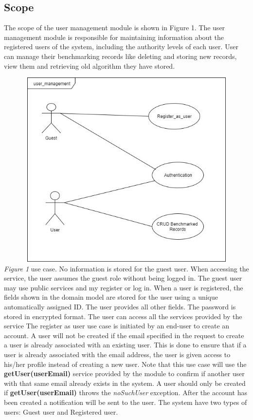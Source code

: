 \documentclass[runningheads,a4paper]{article}
\begin{document}
\subsection{Scope}
The scope of the user management module is shown in Figure 1. The user
management module is responsible for maintaining information about the registered
users of the system, including the authority levels of each user. User can manage their benchmarking records like deleting and storing new records, view them and retrieving old algorithm they have stored.

\includegraphics[width=15cm , height=10cm]{../Images/userDiagram.jpg}
\newline 
\textit{Figure 1} use case.
\newline
\newline No information is stored for the guest user. When accessing the service, the user
assumes the guest role without being logged in. The guest user may use public
services and my register or log in.
When a user is registered, the fields shown in the domain model are stored for the
user using a unique automatically assigned ID. The user provides all other fields. The
password is stored in encrypted format. The user can access all the services provided by the service
The register as user  use case is initiated by an end-user to create an account.\newline\newline
A user will not be created if the email specified in the request to create a user is already
associated with an existing user. This is done to ensure that if a user is already associated
with the email address, the user is given access to his/her profile instead of creating a new
user.\newline\newline
Note that this use case will use the \textbf{getUser(userEmail)} service provided by the module to
confirm if another user with that same email already exists in the system. A user should
only be created if \textbf{getUser(userEmail)} throws the \textit{noSuchUser} exception.
After the account has been created a notification will be sent to the user. The system have two types of users: Guest user and Registered user.
\end{document}
